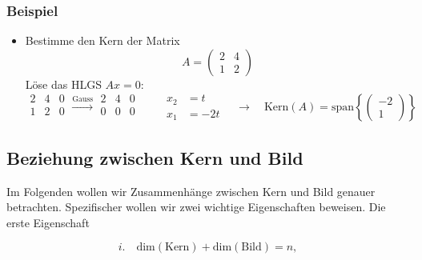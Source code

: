 \subsubsection*{Beispiel}

\begin{itemize}
    \item Bestimme den Kern der Matrix
    \begin{equation*}
        A = \begin{pmatrix} 2 & 4 \\ 1 & 2 \end{pmatrix}
    \end{equation*}
    Löse das HLGS \( Ax = 0 \):
    \begin{equation*}
        \begin{array}{cc|c}
            2 & 4 & 0 \\
            1 & 2 & 0 \\
        \end{array} \xrightarrow{\text{Gauss}}
        \begin{array}{cc|c}
            2 & 4 & 0 \\
            0 & 0 & 0 \\
        \end{array} \qquad
        \begin{aligned}
            x_2 &= t \\
            x_1 &= -2t 
        \end{aligned} \quad \rightarrow \quad \text{Kern}(A) = \text{span} \left\{ 
        \begin{pmatrix}
            -2 \\ 1 
        \end{pmatrix} \right\}
    \end{equation*} 
\end{itemize}

\subsection{Beziehung zwischen Kern und Bild}

Im Folgenden wollen wir Zusammenhänge zwischen Kern und Bild genauer betrachten. Spezifischer wollen wir zwei wichtige Eigenschaften beweisen. Die erste Eigenschaft 

\begin{equation*}
    i. \quad \text{dim}(\text{Kern}) + \text{dim}(\text{Bild}) = n,
\end{equation*}

